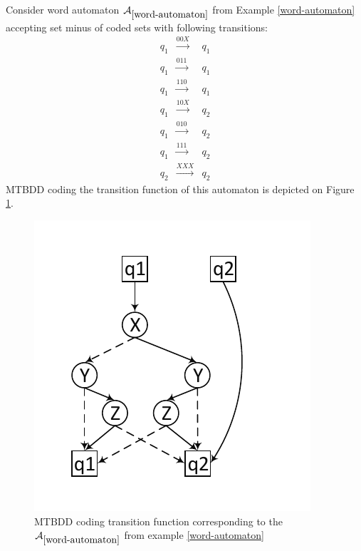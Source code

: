 \noindent\hrulefill
\begin{example}
 Consider word automaton $\mathcal{A}_{\ref{word-automaton}}$ from Example
 \ref{word-automaton} accepting set minus of coded sets with following transitions:
 \begin{eqnarray*}
  q_1 & \overset{00X}{\longrightarrow} & q_1\\
  q_1 & \overset{011}{\longrightarrow} & q_1\\
  q_1 & \overset{110}{\longrightarrow} & q_1\\
  q_1 & \overset{10X}{\longrightarrow} & q_2\\
  q_1 & \overset{010}{\longrightarrow} & q_2\\
  q_1 & \overset{111}{\longrightarrow} & q_2\\
  q_2 & \overset{XXX}{\longrightarrow} & q_2
 \end{eqnarray*}
  MTBDD coding the transition function of this automaton is depicted on Figure
  \ref{mtbdd}.
 
 \begin{figure}[h!]
  \begin{center}
   \includegraphics{fig/bdd-transition-function-encoding}
  \end{center}
  \caption{MTBDD coding transition function corresponding to the
  $\mathcal{A}_{\ref{word-automaton}}$ from example
  \ref{word-automaton}}\label{mtbdd}
 \end{figure}
 
\end{example}

